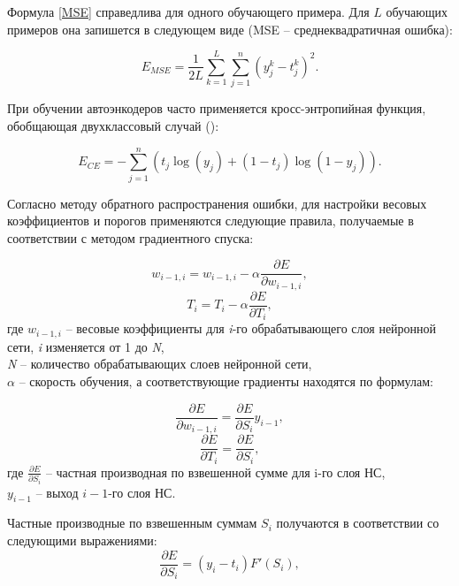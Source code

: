 Формула \ref{MSE} справедлива для одного обучающего примера. Для $L$ обучающих примеров она запишется в следующем виде (MSE -- среднеквадратичная ошибка):

\begin{equation}
	\label{MSE_L}
	E_{MSE} = \frac{1}{2L}\sum_{k=1}^{L}\sum_{j=1}^{n}(y_j^k - t_j^k)^2.
\end{equation}

При обучении автоэнкодеров часто применяется кросс-энтропийная функция, обобщающая двухклассовый случай (\cite{Amaral2013}):

\begin{equation}
	\label{CE}
	E_{CE} = -\sum_{j=1}^n(t_j\log(y_j) + (1-t_j)\log(1-y_j)).
\end{equation}

Согласно методу обратного распространения ошибки, для настройки весовых коэффициентов и порогов применяются следующие правила, получаемые в соответствии с методом градиентного спуска:

\begin{equation}
	w_{i-1,i} = w_{i-1, i} - \alpha \frac{\partial E}{\partial w_{i-1, i}},
\end{equation}
\begin{equation}
	T_i = T_i - \alpha \frac{\partial E}{\partial T_i},
\end{equation}
где $w_{i-1,i}$ -- весовые коэффициенты для \textit{i}-го обрабатывающего слоя нейронной сети, \textit{i} изменяется от 1 до \textit{N},\\
\textit{N} -- количество обрабатывающих слоев нейронной сети,\\
$\alpha$ -- скорость обучения, а соответствующие градиенты находятся по формулам:

\begin{equation}
	\label{weights_delta}
	\frac{\partial E}{\partial w_{i-1, i}} = \frac{\partial E}{\partial S_i} y_{i-1},
\end{equation}
\begin{equation}
	\label{biases_delta}
	\frac{\partial E}{\partial T_i} = \frac{\partial E}{\partial S_i},
\end{equation}
где $\frac{\partial E}{\partial S_i}$ -- частная производная по взвешенной сумме для i-го слоя НС,\\
$y_{i-1}$ -- выход $i-1$-го слоя НС.


Частные производные по взвешенным суммам $S_i$ получаются в соответствии со следующими выражениями:
\begin{equation}
	\label{last_layer_error}
	\frac{\partial E}{\partial S_i} = (y_i - t_i)F'(S_i),
\end{equation}

